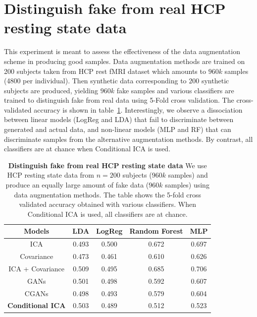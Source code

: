  
\section{Distinguish fake from real HCP resting state data}
This experiment is meant to assess the effectiveness of the data
augmentation scheme in producing good samples.
Data augmentation methods are trained on 200 subjects taken from HCP rest fMRI
dataset which amounts to $960k$ samples (4800
per individual). Then synthetic
data corresponding to $200$ synthetic subjects are produced, yielding
$960k$ fake samples and various classifiers are trained to distinguish fake from
real data using 5-Fold cross validation. The cross-validated accuracy is shown
in table~\ref{tab2}.
Interestingly, we observe a dissociation between linear models (LogReg
and LDA) that fail to discriminate between generated and actual data,
and non-linear models (MLP and RF) that can discriminate samples from
the alternative augmentation methods.
%
By contrast, all classifiers are at chance when Conditional ICA is used.

\begin{table}
\begin{center}
\begin{tabular}{c|cccc}
\hline
Models & LDA  & LogReg & Random Forest &  MLP 
\\ \hline
ICA   & 0.493 & 0.500 & 0.672 &  0.697
\\
Covariance   & 0.473 & 0.461 & 0.610 &  0.626
\\
ICA + Covariance   & 0.509 & 0.495 & 0.685 &  0.706
\\
GANs   & 0.501 & 0.498 & 0.592 &  0.607
\\
CGANs   & 0.498 &  0.493 & 0.579 & 0.604
\\\hline
\textbf{Conditional ICA}  & 0.503 & 0.489 & 0.512 &  0.523
\\\hline\hline
\end{tabular}
\end{center}
  \caption{\textbf{Distinguish fake from real HCP resting state data}
    We use HCP resting state data from $n=200$ subjects ($960k$ samples) and produce an equally
    large amount of fake data ($960k$ samples) using data augmentation methods.
    The table shows the 5-fold cross validated accuracy obtained with various
    classifiers. When Conditional ICA is used, all classifiers are at chance.
    }\label{tab2}
\end{table}
%

